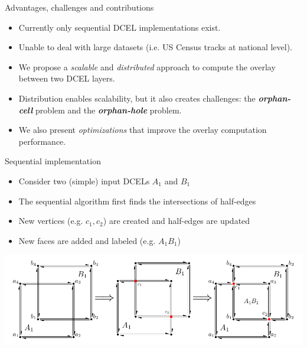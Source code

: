 \documentclass{beamer}
\begin{document}
    \begin{frame}{Advantages, challenges and contributions}
        \begin{itemize}
            \item Currently only sequential DCEL implementations exist.
            \item Unable to deal with large datasets (i.e. US Census tracks at national level).
            \item We propose a \textit{scalable} and \textit{distributed} approach to compute the overlay between two DCEL layers.
            \item Distribution enables scalability, but it also creates challenges: the \textbf{\textit{orphan-cell}} problem and the \textbf{\textit{orphan-hole}} problem.
            \item We also present \textit{optimizations} that improve the overlay computation performance.  
        \end{itemize}
   
    \end{frame}
    
    \begin{frame}{Sequential implementation}
     \begin{itemize}
            \item Consider two (simple) input DCELs $A_1$ and $B_1$
            \item The sequential algorithm first finds the intersections of half-edges
            \item New vertices (e.g. $c_1, c_2$) are created and half-edges are updated
            \item New faces are added and labeled (e.g. $A_1B_1$)
    \end{itemize}     
    
        \centering
        \includegraphics[width=\textwidth]{figures/dcel_seq}
    \end{frame}
    
\end{document}
